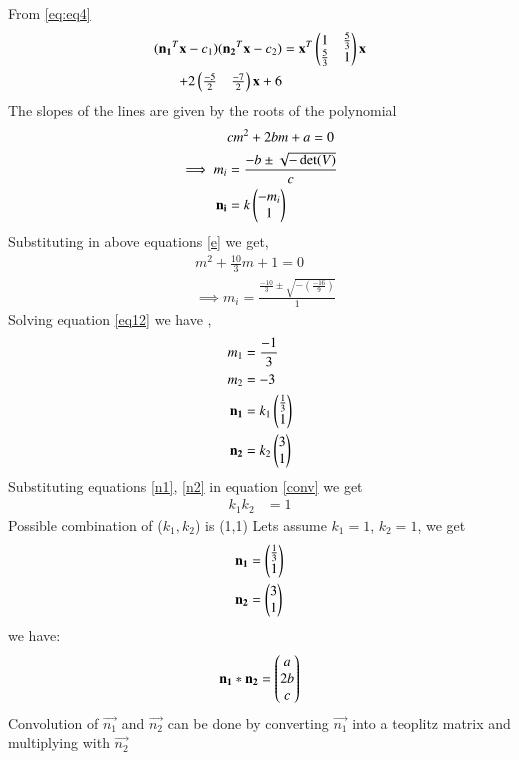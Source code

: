 \documentclass[journal,12pt,twocolumn]{IEEEtran}
\begin{document}
From \eqref{eq:eq4}
\begin{align}
(\mathbf{n_1}^T\mathbf{x}-c_1)(\mathbf{n_2}^T\mathbf{x}-c_2) &=\mathbf{x}^T\begin{pmatrix}1 & \frac{5}{3} \\\frac{5}{3} & 1\end{pmatrix}\mathbf{x}\notag\\
+2\begin{pmatrix}\frac{-5}{2} & \frac{-7}{2}\end{pmatrix}\mathbf{x}+6\label{86}
\end{align}
The slopes of the lines are given by the roots of the polynomial 
\begin{align}
    &cm^2+2bm+a=0\label{e}\\
    \implies m_i&=\frac{-b\pm{\sqrt{-\det(V)}}}{c}\\
    \mathbf{n_i}&=k\begin{pmatrix}-m_i\\1\end{pmatrix}
\end{align}
Substituting  in above equations \eqref{e} we get,
\begin{align}
    &m^2+\frac{10}{3}m+1=0\\
    &\implies m_i=\frac{\frac{-10}{3}\pm{\sqrt{-(\frac{-16}{9})}}}{1}\label{eq12}
\end{align}
Solving equation \eqref{eq12} we have ,
\begin{align}
    m_1&=\frac{-1}{3}\\
    m_2&=-3\\
    \mathbf{n_1}&=k_1\begin{pmatrix}\frac{1}{3}\\1\end{pmatrix}\label{n1}\\
    \mathbf{n_2}&=k_2\begin{pmatrix}{3}\\1\end{pmatrix}\label{n2}
\end{align}
Substituting equations \eqref{n1}, \eqref{n2} in equation \eqref{conv} we get 
\begin{align}
    k_1k_2&=1
\end{align}
Possible combination of ($k_1,k_2$) is (1,1)
Lets assume $k_1=1$, $k_2=1$, we get 
\begin{align}
    \mathbf{n_1}&=\begin{pmatrix}\frac{1}{3} \\1\end{pmatrix}\label{n11}\\
    \mathbf{n_2}&=\begin{pmatrix}3\\1\end{pmatrix}\label{n22}
\end{align}
we have: 
\begin{align}
\mathbf{n_1}\ast \mathbf{n_2} = \begin{pmatrix}a\\2b\\c\end{pmatrix} \label{eq:conv1}
\end{align}
Convolution of $\vec{n_1}$ and $\vec{n_2}$ can be done by converting  $\vec{n_1}$ into a teoplitz matrix and multiplying with $\vec{n_2}$\\
\end{document}
